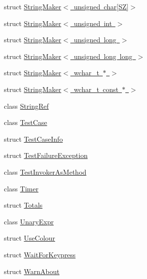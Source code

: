\begin{DoxyCompactItemize}
\item 
struct \mbox{\hyperlink{struct_catch_1_1_string_maker_3_01unsigned_01char[_s_z]_4}{String\+Maker$<$ unsigned char\mbox{[}\+S\+Z\mbox{]}$>$}}
\item 
struct \mbox{\hyperlink{struct_catch_1_1_string_maker_3_01unsigned_01int_01_4}{String\+Maker$<$ unsigned int $>$}}
\item 
struct \mbox{\hyperlink{struct_catch_1_1_string_maker_3_01unsigned_01long_01_4}{String\+Maker$<$ unsigned long $>$}}
\item 
struct \mbox{\hyperlink{struct_catch_1_1_string_maker_3_01unsigned_01long_01long_01_4}{String\+Maker$<$ unsigned long long $>$}}
\item 
struct \mbox{\hyperlink{struct_catch_1_1_string_maker_3_01wchar__t_01_5_01_4}{String\+Maker$<$ wchar\+\_\+t $\ast$ $>$}}
\item 
struct \mbox{\hyperlink{struct_catch_1_1_string_maker_3_01wchar__t_01const_01_5_01_4}{String\+Maker$<$ wchar\+\_\+t const $\ast$ $>$}}
\item 
class \mbox{\hyperlink{class_catch_1_1_string_ref}{String\+Ref}}
\item 
class \mbox{\hyperlink{class_catch_1_1_test_case}{Test\+Case}}
\item 
struct \mbox{\hyperlink{struct_catch_1_1_test_case_info}{Test\+Case\+Info}}
\item 
struct \mbox{\hyperlink{struct_catch_1_1_test_failure_exception}{Test\+Failure\+Exception}}
\item 
class \mbox{\hyperlink{class_catch_1_1_test_invoker_as_method}{Test\+Invoker\+As\+Method}}
\item 
class \mbox{\hyperlink{class_catch_1_1_timer}{Timer}}
\item 
struct \mbox{\hyperlink{struct_catch_1_1_totals}{Totals}}
\item 
class \mbox{\hyperlink{class_catch_1_1_unary_expr}{Unary\+Expr}}
\item 
struct \mbox{\hyperlink{struct_catch_1_1_use_colour}{Use\+Colour}}
\item 
struct \mbox{\hyperlink{struct_catch_1_1_wait_for_keypress}{Wait\+For\+Keypress}}
\item 
struct \mbox{\hyperlink{struct_catch_1_1_warn_about}{Warn\+About}}
\end{DoxyCompactItemize}
